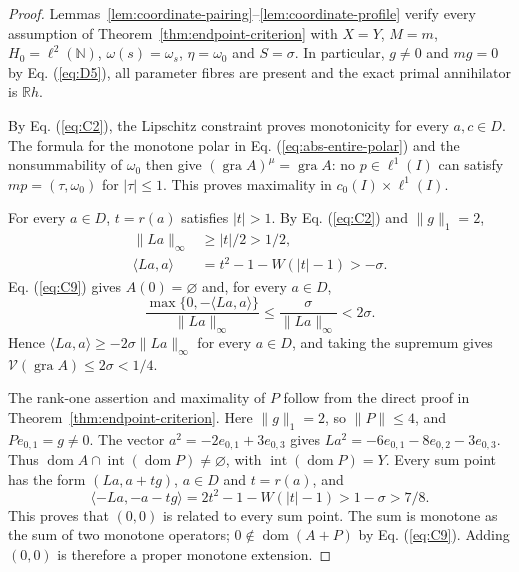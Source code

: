 \documentclass[11pt]{article}
\newcommand{\R}{\mathbb R}
\newcommand{\N}{\mathbb N}
\newcommand{\gra}{\operatorname{gra}}
\newcommand{\dom}{\operatorname{dom}}
\newcommand{\pair}[2]{\langle #1,#2\rangle}
\theoremstyle{definition}
\theoremstyle{remark}
\begin{document}
\begin{proof}
Lemmas~\ref{lem:coordinate-pairing}--\ref{lem:coordinate-profile} verify every assumption of Theorem~\ref{thm:endpoint-criterion} with $X=Y$, $M=m$, $H_0=\ell^2(\N)$, $\omega(s)=\omega_s$, $\eta=\omega_0$ and $S=\sigma$. In particular, $g\ne0$ and $mg=0$ by Eq. (\ref{eq:D5}), all parameter fibres are present and the exact primal annihilator is $\R h$.

By Eq. (\ref{eq:C2}), the Lipschitz constraint proves monotonicity for every $a,c\in D$. The formula for the monotone polar in Eq. (\ref{eq:abs-entire-polar}) and the nonsummability of $\omega_0$ then give $(\gra A)^\mu=\gra A$: no $p\in\ell^1(I)$ can satisfy $mp=(\tau,\omega_0)$ for $|\tau|\le1$. This proves maximality in $c_0(I)\times\ell^1(I)$.

\label{sec:C5}
For every $a\in D$, $t=r(a)$ satisfies $|t|>1$. By Eq. (\ref{eq:C2}) and $\|g\|_1=2$,
\begin{equation}
\begin{aligned}
\|La\|_\infty&\ge|t|/2>1/2,\\
\pair{La}{a}&=t^2-1-W(|t|-1)>-\sigma.
\end{aligned}
\label{eq:C9}
\end{equation}
Eq. (\ref{eq:C9}) gives $A(0)=\varnothing$ and, for every $a\in D$,
\[
\frac{\max\{0,-\pair{La}{a}\}}{\|La\|_\infty}
\le \frac{\sigma}{\|La\|_\infty}
<2\sigma.
\]
Hence $\pair{La}{a}\ge-2\sigma\|La\|_\infty$ for every $a\in D$, and taking the supremum gives $\mathcal V(\gra A)\le2\sigma<1/4$.

\label{sec:C6}
The rank-one assertion and maximality of $P$ follow from the direct proof in Theorem~\ref{thm:endpoint-criterion}. Here $\|g\|_1=2$, so $\|P\|\le4$, and $Pe_{0,1}=g\ne0$. The vector $a^2=-2e_{0,1}+3e_{0,3}$ gives $La^2=-6e_{0,1}-8e_{0,2}-3e_{0,3}$. Thus $\dom A\cap\operatorname{int}(\dom P)\ne\varnothing$, with $\operatorname{int}(\dom P)=Y$. Every sum point has the form $(La,a+tg)$, $a\in D$ and $t=r(a)$, and
\begin{equation}
\pair{-La}{-a-tg}=2t^2-1-W(|t|-1)>1-\sigma>7/8.
\label{eq:C11}
\end{equation}
This proves that $(0,0)$ is related to every sum point. The sum is monotone as the sum of two monotone operators; $0\notin\dom(A+P)$ by Eq. (\ref{eq:C9}). Adding $(0,0)$ is therefore a proper monotone extension.

\end{proof}

\label{sec:domain-comparison}
\end{document}

